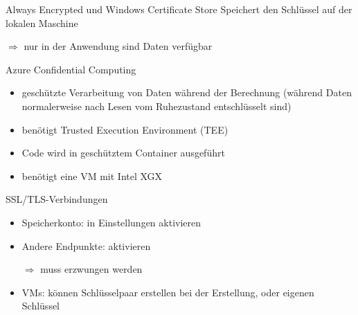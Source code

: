 \begin{flashcard}[Definition]{Always Encrypted und Windows Certificate Store}
    Speichert den Schlüssel auf der lokalen Maschine

    \vspace{1cm}
    $\Rightarrow$ nur in der Anwendung sind Daten verfügbar
\end{flashcard}


\begin{flashcard}[Definition]{Azure Confidential Computing}
    \begin{itemize}
        \item geschützte Verarbeitung von Daten während der Berechnung\newline
            (während Daten normalerweise nach Lesen vom Ruhezustand entschlüsselt sind)
        \item benötigt Trusted Execution Environment (TEE)
        \item Code wird in geschütztem Container ausgeführt
        \item benötigt eine VM mit Intel XGX
    \end{itemize}
\end{flashcard}


\begin{flashcard}[Definition]{SSL/TLS-Verbindungen}
    \begin{itemize}
        \item Speicherkonto: in Einstellungen aktivieren
        \item Andere Endpunkte: aktivieren
        \item[$\Rightarrow$] muss erzwungen werden
        \item VMs: können Schlüsselpaar erstellen bei der Erstellung, oder eigenen Schlüssel
    \end{itemize}
\end{flashcard}


